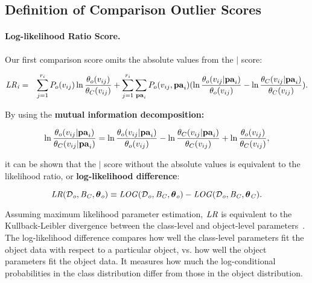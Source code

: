 {\subsection{Definition of Comparison Outlier Scores}

\paragraph{Log-likelihood Ratio Score.} Our first comparison score omits the absolute values from the $\mid$ score: 

\begin{eqnarray*}
\it{LR}_{i} & = & \sum_{j=1}^{r_{i}} P_{o}(v_{ij}) \ln \frac{\theta_{o}( v_{ij})}{\theta_{C}( v_{ij})}+ \sum_{j=1}^{r_{i}} \sum_{\mathbf{pa}_{i}} 
P_{o}( v_{ij},\mathbf{pa}_{i})
(\ln \frac{\theta_{o}( v_{ij}|\mathbf{pa}_{i})}{\theta_{o}(v_{ij})} - \ln \frac{\theta_{C}( v_{ij}|\mathbf{pa}_{i})}{\theta_{C}(v_{ij})}).
\end{eqnarray*}

By using the \textbf{mutual information decomposition:}


\begin{equation} \label{eq:decompose}
\ln \frac{\theta_{o}( v_{ij}|\mathbf{pa}_{i})}{\theta_{C}( v_{ij}|\mathbf{pa}_{i})} = \ln \frac{\theta_{o}(v_{ij}|\mathbf{pa}_{i})}{\theta_{o}(v_{ij})} - \ln \frac{\theta_{C}( v_{ij}|\mathbf{pa}_{i})}{\theta_{C}(v_{ij})} + \ln \frac{\theta_{o}( v_{ij})}{\theta_{C}( v_{ij})},
\end{equation}

\noindent it can be shown that the $\mid$ score without the absolute values is equivalent to 
the likelihood ratio, or {\bf log-likelihood difference}:

\begin{equation} \label{eq:log-diff}
\it{LR}(\mathcal{D}_{o},B_{C},\boldsymbol{\theta}_{o}) \equiv \it{LOG}(\mathcal{D}_{o},B_{C},\boldsymbol{\theta}_{o}) - \it{LOG}(\mathcal{D}_{o},B_{C},\boldsymbol{\theta}_{C}).
\end{equation}

Assuming maximum likelihood parameter estimation, $\it{LR}$ is equivalent to the Kullback-Leibler divergence between the class-level and object-level parameters~\citep{Campos2006}. The log-likelihood difference compares  how well the class-level parameters fit the object data with respect to a particular object, vs. how well the object parameters fit the object data. It measures how much the log-conditional probabilities in the class distribution differ from those in the object distribution. 
%
}
